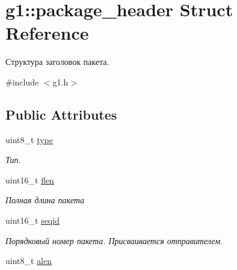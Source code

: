\hypertarget{structg1_1_1package__header}{}\section{g1\+:\+:package\+\_\+header Struct Reference}
\label{structg1_1_1package__header}


Структура заголовок пакета.  




{\ttfamily \#include $<$g1.\+h$>$}

\subsection*{Public Attributes}
\begin{DoxyCompactItemize}
\item 
uint8\+\_\+t \hyperlink{structg1_1_1package__header_a77aeda3b76d39b1067afd494c58873af}{type}\hypertarget{structg1_1_1package__header_a77aeda3b76d39b1067afd494c58873af}{}\label{structg1_1_1package__header_a77aeda3b76d39b1067afd494c58873af}

\begin{DoxyCompactList}\small\item\em Тип. \end{DoxyCompactList}\item 
uint16\+\_\+t \hyperlink{structg1_1_1package__header_a148b733fe97c06f0ded129f2a1d953c1}{flen}\hypertarget{structg1_1_1package__header_a148b733fe97c06f0ded129f2a1d953c1}{}\label{structg1_1_1package__header_a148b733fe97c06f0ded129f2a1d953c1}

\begin{DoxyCompactList}\small\item\em Полная длина пакета \end{DoxyCompactList}\item 
uint16\+\_\+t \hyperlink{structg1_1_1package__header_a8f706d30ff3d9154aff97827aa291af8}{seqid}\hypertarget{structg1_1_1package__header_a8f706d30ff3d9154aff97827aa291af8}{}\label{structg1_1_1package__header_a8f706d30ff3d9154aff97827aa291af8}

\begin{DoxyCompactList}\small\item\em Порядковый номер пакета. Присваивается отправителем. \end{DoxyCompactList}\item 
uint8\+\_\+t \hyperlink{structg1_1_1package__header_aca2dc89b824e81d9aaa99488aab21fe7}{alen}\hypertarget{structg1_1_1package__header_aca2dc89b824e81d9aaa99488aab21fe7}{}\label{structg1_1_1package__header_aca2dc89b824e81d9aaa99488aab21fe7}


\end{DoxyCompactItemize}
